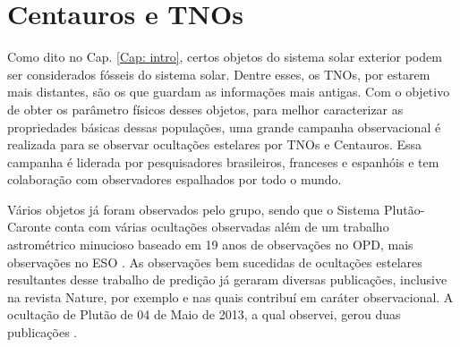 \documentclass[12pt,a4paper]{monografia}
\begin{document}


\section{Centauros e TNOs}
\label{Sec: TNO-occ}

\indent \indent Como dito no Cap. \ref{Cap: intro}, certos objetos do sistema solar exterior podem ser considerados fósseis do sistema solar. Dentre esses, os TNOs, por estarem mais distantes, são os que guardam as informações mais antigas. Com o objetivo de obter os parâmetro físicos desses objetos, para melhor caracterizar as propriedades básicas dessas populações, uma grande campanha observacional é realizada para se observar ocultações estelares por TNOs e Centauros. Essa campanha é liderada por pesquisadores brasileiros, franceses e espanhóis e tem colaboração com observadores espalhados por todo o mundo.

Vários objetos já foram observados pelo grupo, sendo que o Sistema Plutão-Caronte conta com várias ocultações observadas além de um trabalho astrométrico minucioso baseado em 19 anos de observações no OPD, mais observações no ESO \citep{Rossi2014}. As observações bem sucedidas de ocultações estelares resultantes desse trabalho de predição já geraram diversas publicações, inclusive na revista Nature, por exemplo \cite{Sicardy2011} e \cite{BragaRibas2014} nas quais contribuí em caráter observacional. A ocultação de Plutão de 04 de Maio de 2013, a qual observei, gerou duas publicações \citep{Olkin2015, DiasOliveira2015}.
\end{document}
